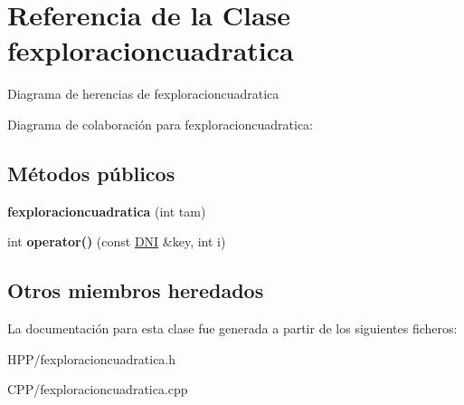 \hypertarget{classfexploracioncuadratica}{}\section{Referencia de la Clase fexploracioncuadratica}
\label{classfexploracioncuadratica}


Diagrama de herencias de fexploracioncuadratica


Diagrama de colaboración para fexploracioncuadratica\+:
\subsection*{Métodos públicos}
\begin{DoxyCompactItemize}
\item 
\mbox{\label{classfexploracioncuadratica_ac97101c09570ba2a7ba6f89180989bf2}} 
{\bfseries fexploracioncuadratica} (int tam)
\item 
\mbox{\label{classfexploracioncuadratica_a40dcb318ba72458d2714f807a75ce255}} 
int {\bfseries operator()} (const \hyperlink{classDNI}{D\+NI} \&key, int i)
\end{DoxyCompactItemize}
\subsection*{Otros miembros heredados}


La documentación para esta clase fue generada a partir de los siguientes ficheros\+:\begin{DoxyCompactItemize}
\item 
H\+P\+P/fexploracioncuadratica.\+h\item 
C\+P\+P/fexploracioncuadratica.\+cpp\end{DoxyCompactItemize}
